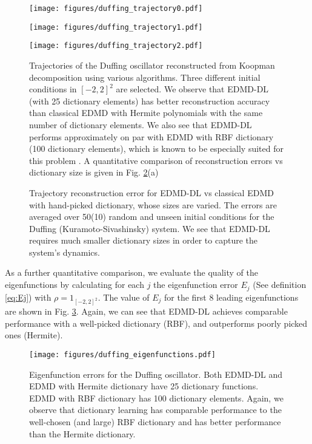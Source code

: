 \documentclass[%
 aip,
 cha,
 sd,%
 amsmath,amssymb,
 preprint,%
]{revtex4-1}
\begin{document}
\begin{figure}
	\begin{center}
		\texttt{[image: figures/duffing\_trajectory0.pdf]}
		
		\texttt{[image: figures/duffing\_trajectory1.pdf]}
		
		\texttt{[image: figures/duffing\_trajectory2.pdf]}
	\end{center}
	\caption{Trajectories of the Duffing oscillator reconstructed from Koopman decomposition using various algorithms. Three different initial conditions in $[-2,2]^2$ are selected. We observe that EDMD-DL (with 25 dictionary elements) has better reconstruction accuracy than classical EDMD with Hermite polynomials with the same number of dictionary elements. We also see that EDMD-DL performs approximately on par with EDMD with RBF dictionary (100 dictionary elements), which is known to be especially suited for this problem \cite{williams2015data}. A quantitative comparison of reconstruction errors vs dictionary size is given in Fig. \ref{fig:num_dict}(a)}
	\label{fig:duffing_traj}
\end{figure}
\begin{figure}
	\begin{center}
	\end{center}
	\caption{Trajectory reconstruction error for EDMD-DL vs classical EDMD with hand-picked dictionary, whose sizes are varied. The errors are averaged over 50(10) random and unseen initial conditions for the Duffing (Kuramoto-Sivashinsky) system. We see that EDMD-DL requires much smaller dictionary sizes in order to capture the system's dynamics. }
	\label{fig:num_dict}
\end{figure}

As a further quantitative comparison, we evaluate the quality of the eigenfunctions by calculating for each $j$ the eigenfunction error $E_j$ (See definition \eqref{eq:Ej}) with $\rho = 1_{[-2,2]^2}$. The value of $E_j$ for the first 8 leading eigenfunctions are shown in Fig. \ref{fig:duffing_efuns}. Again, we can see that EDMD-DL achieves comparable performance with a well-picked dictionary (RBF), and outperforms poorly picked ones (Hermite). 
\begin{figure}
	\begin{center}
		\texttt{[image: figures/duffing\_eigenfunctions.pdf]}
	\end{center}
	\caption{Eigenfunction errors for the Duffing oscillator. Both EDMD-DL and EDMD with Hermite dictionary have 25 dictionary functions. EDMD with RBF dictionary has 100 dictionary elements. Again, we observe that dictionary learning has comparable performance to the well-chosen (and large) RBF dictionary and has better performance than the Hermite dictionary. }
	\label{fig:duffing_efuns}
\end{figure}
\end{document}
